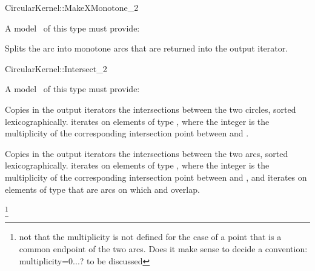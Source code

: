 \begin{ccRefConcept}{CircularKernel::MakeXMonotone_2}

\ccDefinition


A model \ccVar\ of this type must provide:

{Splits the arc  into monotone arcs that are returned into the 
output iterator.}

\ccHasModels


\ccSeeAlso


\end{ccRefConcept}
\begin{ccRefConcept}{CircularKernel::Intersect_2}

\ccDefinition


A model \ccVar\ of this type must provide:

{Copies in the output iterators the intersections between the two circles, sorted lexicographically.  iterates on elements of type , where the integer is the multiplicity of the corresponding intersection point between  and . 
}

{Copies in the output iterators the intersections between the two arcs, sorted lexicographically.  iterates on elements of type , where the integer is the multiplicity of the corresponding intersection point between  and , and  iterates on elements of type  that are arcs on which  and  overlap.}

\footnote{not that the multiplicity is not defined for the case of a point that is a common endpoint of the two arcs. Does it make sense to decide a convention: multiplicity=0...? to be discussed}

\ccHasModels


\ccSeeAlso


\end{ccRefConcept}
